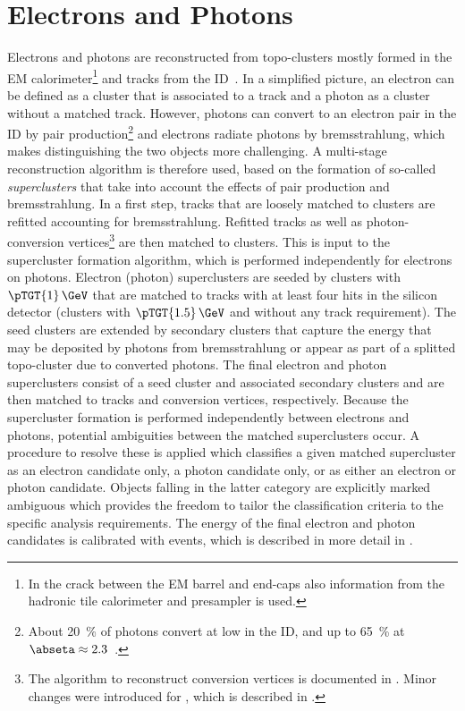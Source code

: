 \section{Electrons and Photons}
\label{sec:electron-photon-reconstruction}
Electrons and photons are reconstructed from topo-clusters mostly formed in the EM calorimeter\footnote{In the crack between the EM barrel and end-caps also information from the hadronic tile calorimeter and presampler is used.} and tracks from the ID~\cite{EGAM-2018-01}.
In a simplified picture, an electron can be defined as a cluster that is associated to a track and a photon as a cluster without a matched track.
However, photons can convert to an electron pair in the ID by pair production\footnote{About \SI{20}{\percent} of photons convert at low \abseta in the ID, and up to \SI{65}{\percent} at $\abseta \approx 2.3$~\cite{EGAM-2018-01}.} and electrons radiate photons by bremsstrahlung, which makes distinguishing the two objects more challenging.
A multi-stage reconstruction algorithm is therefore used, based on the formation of so-called \emph{superclusters} that take into account the effects of pair production and bremsstrahlung.
In a first step, tracks that are loosely matched to clusters are refitted accounting for bremsstrahlung. Refitted tracks as well as photon-conversion vertices\footnote{The algorithm to reconstruct conversion vertices is documented in . Minor changes were introduced for \RunTwo, which is described in .} are then matched to clusters.
This is input to the supercluster formation algorithm, which is performed independently for electrons on photons.
Electron (photon) superclusters are seeded by clusters with $\pTGT{1}\,\GeV$ that are matched to tracks with at least four hits in the silicon detector (clusters with $\pTGT{1.5}\,\GeV$ and without any track requirement).
The seed clusters are extended by secondary clusters that capture the energy that may be deposited by photons from bremsstrahlung or appear as part of a splitted topo-cluster due to converted photons.
The final electron and photon superclusters consist of a seed cluster and associated secondary clusters and are then matched to tracks and conversion vertices, respectively.
Because the supercluster formation is performed independently between electrons and photons, potential ambiguities between the matched superclusters occur. A procedure to resolve these is applied which classifies a given matched supercluster as an electron candidate only, a photon candidate only, or as either an electron or photon candidate.
Objects falling in the latter category are explicitly marked ambiguous which provides the freedom to tailor the classification criteria to the specific analysis requirements.
The energy of the final electron and photon candidates is calibrated with \Zee events, which is described in more detail in .

